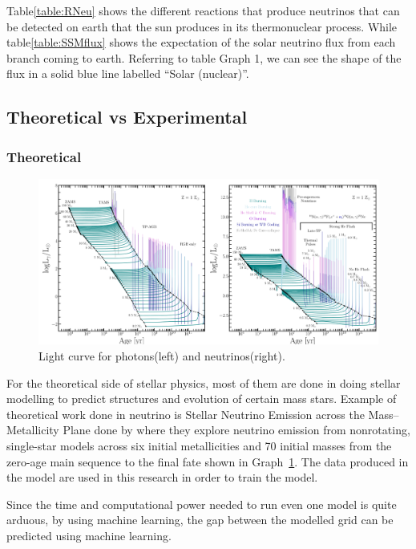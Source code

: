 Table\ref{table:RNeu}  shows the different reactions that produce neutrinos that can be detected on earth that the sun produces in its thermonuclear process. While table\ref{table:SSMflux}  shows the expectation of the solar neutrino flux from each branch coming to earth. Referring to table Graph 1, we can see the shape of the flux in a solid blue line labelled ``Solar (nuclear)''.

\subsection{Theoretical vs Experimental}

\subsubsection{Theoretical}

\begin{figure}[H]
	\centering
	\includegraphics[width=\textwidth,height=\textheight]{assets/FaragLA.png}
	\caption{Light curve for photons(left) and neutrinos(right).}
	\label{Graph:Lcurve}
\end{figure}

For the theoretical side of stellar physics, most of them are done in doing stellar modelling to predict structures and evolution of certain mass stars. Example of theoretical work done in neutrino is Stellar Neutrino Emission across the Mass–Metallicity Plane done by  where they explore neutrino emission from nonrotating, single-star models across six initial metallicities and 70 initial masses from the zero-age main sequence to the final fate shown in Graph~\ref{Graph:Lcurve}. The data produced in the model are used in this research in order to train the model.

Since the time and computational power needed to run even one model is quite arduous, by using machine learning, the gap between the modelled grid can be predicted using machine learning.


